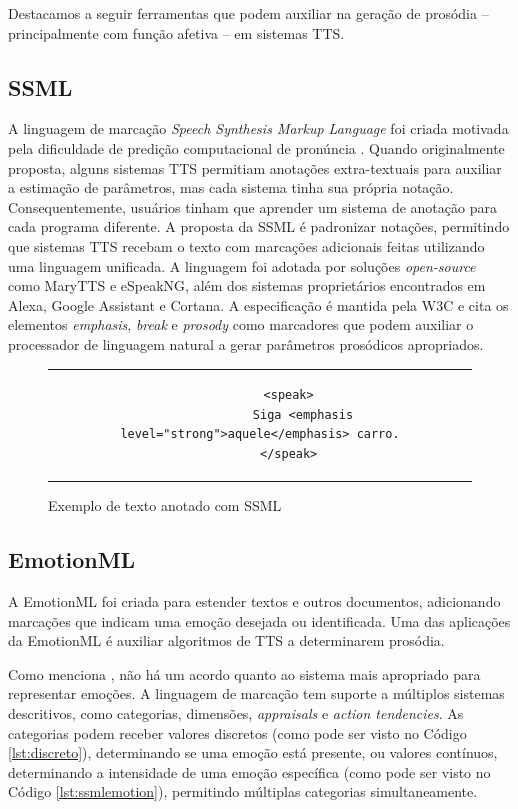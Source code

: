 Destacamos a seguir ferramentas que podem auxiliar na geração de prosódia --
principalmente com função afetiva -- em sistemas TTS.

\subsection{SSML}
A linguagem de marcação \emph{Speech Synthesis Markup Language} foi criada
motivada pela dificuldade de predição computacional de pronúncia
\cite{ssmlpaper}. Quando originalmente proposta, alguns sistemas TTS
permitiam anotações extra-textuais para auxiliar a estimação de parâmetros, mas
cada sistema tinha sua própria notação. Consequentemente, usuários tinham que
aprender um sistema de anotação para cada programa diferente. A proposta da SSML
é padronizar notações, permitindo que sistemas TTS recebam o texto com marcações
adicionais feitas utilizando uma linguagem unificada. A linguagem foi adotada
por soluções \emph{open-source} como MaryTTS e eSpeakNG, além dos sistemas
proprietários encontrados em Alexa, Google Assistant e Cortana. A especificação
é mantida pela W3C \cite{ssml} e cita os elementos \emph{emphasis}, \emph{break}
e \emph{prosody} como marcadores que podem auxiliar o processador de linguagem
natural a gerar parâmetros prosódicos apropriados.

\begin{figure}[thp]
    \centering
    \begin{tabular}{c}
        \begin{lstlisting}
        <speak>
            Siga <emphasis level="strong">aquele</emphasis> carro.
        </speak>
        \end{lstlisting}
    \end{tabular}
    \caption{Exemplo de texto anotado com SSML}
\end{figure}

\subsection{EmotionML}
A EmotionML \cite{emotionml} foi criada para estender textos e outros
documentos, adicionando marcações que indicam uma emoção desejada ou
identificada. Uma das aplicações da EmotionML é auxiliar algoritmos de TTS a
determinarem prosódia.

Como menciona , não há um acordo quanto ao sistema mais
apropriado para representar emoções. A linguagem de marcação tem suporte a
múltiplos sistemas descritivos, como categorias, dimensões, \emph{appraisals} e \emph{action tendencies}. As categorias podem receber valores discretos (como pode ser
visto no Código \ref{lst:discreto}), determinando se uma emoção está presente, ou
valores contínuos, determinando a intensidade de uma emoção específica (como
pode ser visto no Código \ref{lst:ssmlemotion}), permitindo múltiplas categorias
simultaneamente.


